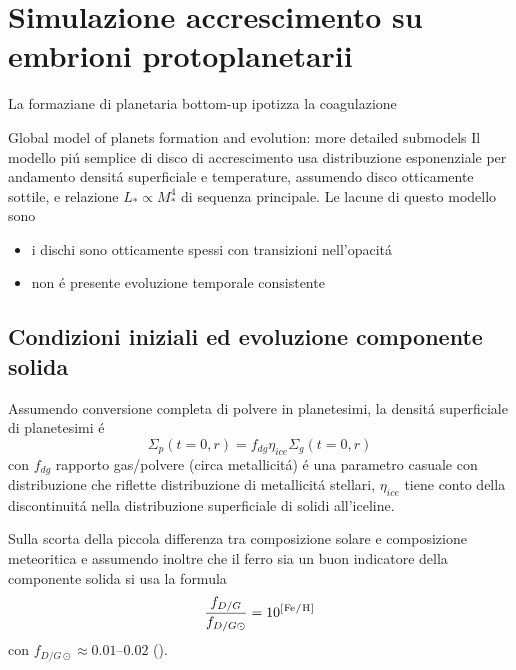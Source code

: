 {\let\clearpage\relax\let\cleardoublepage\relax
	\chapter{Simulazione accrescimento su embrioni protoplanetarii}
}

\begin{workout}
La formaziane di planetaria bottom-up ipotizza la coagulazione  
\end{workout}

\begin{workout}
	Global model of planets formation and evolution: more detailed submodels
	Il modello pi\'u semplice di disco di accrescimento usa distribuzione esponenziale per andamento densit\'a superficiale e temperature, assumendo disco otticamente sottile, e relazione $L_*\propto M_*^4$ di sequenza principale. Le lacune di questo modello sono
	\begin{itemize}
		\item i dischi sono otticamente spessi con transizioni nell'opacit\'a
		\item non \'e presente evoluzione temporale consistente
	\end{itemize}
\end{workout}

\section{Condizioni iniziali ed evoluzione componente solida}

Assumendo conversione completa di polvere in planetesimi, la densit\'a superficiale di planetesimi \'e
\begin{equation}
\Sigma_p(t=0,r)=f_{dg}\eta_{ice}\Sigma_g(t=0,r)
\end{equation}
con $f_{dg}$ rapporto gas/polvere (circa metallicit\'a) \'e una parametro casuale con distribuzione che riflette distribuzione di metallicit\'a stellari, $\eta_{ice}$ tiene conto della discontinuit\'a nella distribuzione superficiale di solidi all'iceline.

Sulla scorta della piccola differenza tra composizione solare e composizione meteoritica e assumendo inoltre che il ferro sia un buon indicatore della componente solida  si usa la formula
\begin{equation}
\frac{f_{D/G}}{f_{D/G\odot}}=10\expy{[\cel{Fe}{}{}{}/\cel{H}{}{}{}]}
\end{equation}
con $f_{D/G\odot}\approx\numrange{0.01}{0.02}$ (\cite{lodders2003solar}).

